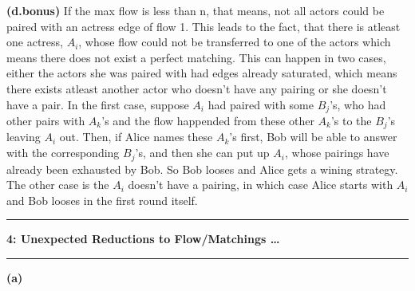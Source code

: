 \documentclass{article}
\newcommand\question[2]{\vspace{.25in}\hrule\textbf{#1: #2}\hrule\vspace{.10in}}
\renewcommand\part[1]{\vspace{.10in}\textbf{(#1)}}
\begin{document}
  \part{d.bonus} If the max flow is less than n, that means, not all actors could be paired with an actress edge of flow 1. This leads to the fact, that there is atleast one actress, $A_i$, whose flow could not be transferred to one of the actors which means there does not exist a perfect matching. This can happen in two cases, either the actors she was paired with had edges already saturated, which means there exists atleast another actor who doesn't have any pairing or she doesn't have a pair. In the first case, suppose $A_{i}$ had paired with some $B_j$'s, who had other pairs with $A_k$'s and the flow happended from these other $A_k$'s to the $B_j$'s leaving $A_i$ out. Then, if Alice names these $A_k$'s first, Bob will be able to answer with the corresponding $B_j$'s, and then she can put up $A_i$, whose pairings have already been exhausted by Bob. So Bob looses and Alice gets a wining strategy. The other case is the $A_i$ doesn't have a pairing, in which case Alice starts with $A_i$ and Bob looses in the first round itself. \newline

  \question{4}{Unexpected Reductions to Flow/Matchings \dots}

  \part{a}
\end{document}
